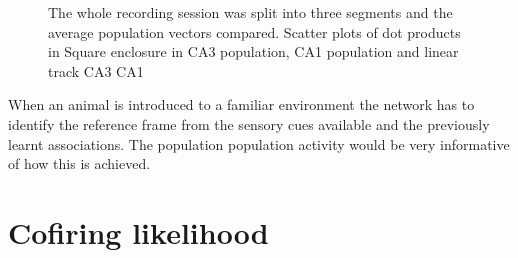 
\begin{figure}[htb!]
\centering
{}
\caption[CA3 Population Vector analysis]{The whole recording session was split into three segments and the average population vectors compared. Scatter plots of dot products in Square enclosure in  CA3 population,  CA1 population and linear track  CA3  CA1}
\end{figure}

When an animal is introduced to a familiar environment the network has to identify the reference frame from the sensory cues available and the previously learnt associations. The population population activity would be very informative of how this is achieved. 
\section{Cofiring likelihood}
\begin{figure}[H]
\centering
{}
\end{figure}

